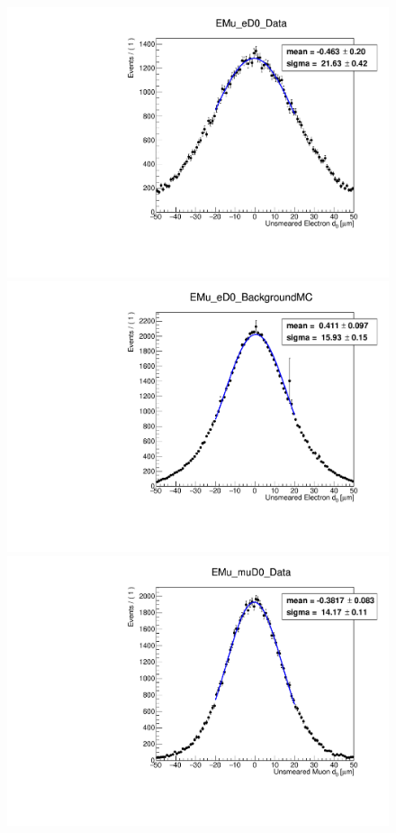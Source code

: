 \begin{figure}[hbtp]
\centering
\includegraphics[scale=0.3]{figures/corrections/d0_smearing/emu_2017/gaussian_fit_EMu_eD0_Data.pdf}
\includegraphics[scale=0.3]{figures/corrections/d0_smearing/emu_2017/gaussian_fit_EMu_eD0_BackgroundMC.pdf}
\includegraphics[scale=0.3]{figures/corrections/d0_smearing/emu_2017/gaussian_fit_EMu_muD0_Data.pdf} 

\end{figure}
